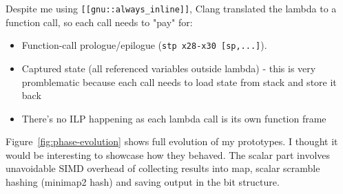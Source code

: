 Despite me using 
\texttt{[[gnu::always\_inline]]}, Clang translated the lambda to a function call, so each call needs to "pay" for:

\begin{itemize}
\item Function-call prologue/epilogue (\texttt{stp x28-x30 [sp,...]}).
\item Captured state (all referenced variables outside lambda) - this is very promblematic because each call
needs to load state from stack and store it back
\item There's no ILP happening as each lambda call is its own function frame
\end{itemize}

Figure~\ref{fig:phase-evolution} shows full evolution of my prototypes. I thought it would be interesting to showcase how they behaved.
The scalar part involves unavoidable SIMD overhead of collecting results into map, scalar scramble hashing (minimap2 hash) and saving output in the bit structure.

